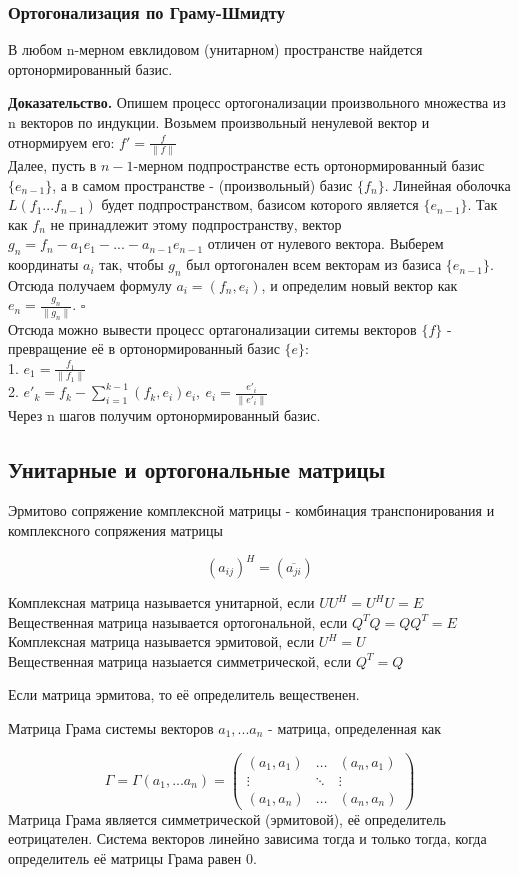 \subsubsection{Ортогонализация по Граму-Шмидту}
\begin{theor}
В любом n-мерном евклидовом (унитарном) пространстве найдется ортонормированный
базис.
\end{theor}
\textbf{Доказательство.} Опишем процесс ортогонализации произвольного множества
из n векторов по индукции. Возьмем произвольный ненулевой вектор и отнормируем
его: $f'=\frac{f}{\|f\|}$\\
Далее, пусть в $n-1$-мерном подпространстве есть ортонормированный базис 
$\{e_{n-1}\}$, а в самом пространстве - (произвольный) базис $\{f_n\}$. 
Линейная оболочка $L(f_1...f_{n-1})$ будет
подпространством, базисом которого является $\{e_{n-1}\}$. Так как $f_n$ не
принадлежит этому подпространству, вектор $g_n=f_n-a_1e_1-...-a_{n-1}e_{n-1}$
отличен от нулевого вектора.
Выберем координаты $a_i$ так, чтобы $g_n$ был ортогонален всем векторам из 
базиса $\{e_{n-1}\}$. Отсюда получаем формулу $a_i=(f_n,e_i)$, и определим 
новый вектор как $e_n=\frac{g_n}{\|g_n\|}$. $\square$\\
Отсюда можно вывести процесс ортагонализации ситемы векторов $\{f\}$ - 
превращение её в ортонормированный базис $\{e\}$:\\
1. $e_1=\frac{f_1}{\|f_1\|}$\\
2. $e'_k=f_k-\sum\limits^{k-1}_{i=1}(f_k,e_i)e_i,~e_i=\frac{e'_i}{\|e'_i\|}$\\
Через n шагов получим ортонормированный базис.

\subsection{Унитарные и ортогональные матрицы}
\begin{defin}
Эрмитово сопряжение комплексной матрицы - комбинация
транспонирования и комплексного сопряжения матрицы
\end{defin}
$$(a_{ij})^H=(\overline{a_{ji}})$$
\begin{defin}
Комплексная матрица называется унитарной, если $UU^H=U^HU=E$\\
Вещественная матрица называется ортогональной, если 
$Q^TQ=QQ^T=E$\\
Комплексная матрица называется эрмитовой, если $U^H=U$\\
Вещественная матрица назыается симметрической, если $Q^T=Q$
\end{defin}
Если матрица эрмитова, то её определитель вещественен.
\begin{defin}
Матрица Грама системы векторов $a_1,...a_n$ - матрица, определенная как 
\end{defin}
$$\Gamma=\Gamma(a_1,...a_n)=\begin{pmatrix}(a_1,a_1)&\ldots&(a_n,a_1)\\\vdots&
\ddots&\vdots\\(a_1,a_n)&\ldots&(a_n,a_n)\end{pmatrix}$$
Матрица Грама является симметрической (эрмитовой), её определитель еотрицателен.
Система векторов линейно зависима тогда и только тогда, когда определитель её
матрицы Грама равен 0.


